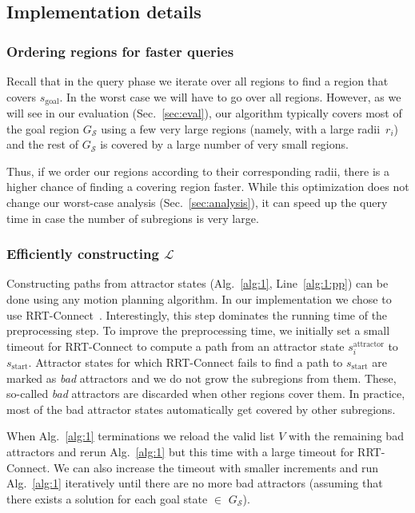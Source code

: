\documentclass[letterpaper]{article} %
\newcommand{\calL}{\ensuremath{\mathcal{L}}\xspace}
\newcommand{\calS}{\ensuremath{\mathcal{S}}\xspace}
\newcommand{\sAttract}{\ensuremath{s^{\text{attractor}}_i}\xspace}
\newcommand{\sStart}{\ensuremath{s_{\text{start}}\xspace}}
\newcommand{\sGoal}{\ensuremath{s_{\text{goal}}\xspace}}
\begin{document}
\subsection{Implementation details}
\label{subsec:impl}

\subsubsection{Ordering regions for faster queries}
Recall that in the query phase we iterate over all regions to find a region that covers \sGoal. 
In the worst case we will have to go over all regions.
However, as we will see in our evaluation (Sec.~\ref{sec:eval}), our algorithm typically covers most of the goal region $G_\calS$ using a few very large regions (namely, with a large radii~$r_i$) and the rest of $G_\calS$ is covered by a large number of very small regions.

Thus, if we order our regions according to their corresponding radii, there is a higher chance of finding a covering region faster. While this optimization does not change our worst-case analysis (Sec.~\ref{sec:analysis}), it can speed up the query time in case the number of subregions is very large.

\subsubsection{Efficiently constructing $\calL$}
Constructing paths from attractor states (Alg.~\ref{alg:1}, Line~\ref{alg:1:pp}) can be done using any motion planning algorithm.
In our implementation we chose to use \textsf{RRT-Connect}~\cite{KL00}.
Interestingly, this step dominates the running time of the preprocessing step.
%
To improve the preprocessing time, we initially set a small timeout for \textsf{RRT-Connect} to compute a path from an attractor state $\sAttract$ to $\sStart$.
Attractor states for which \textsf{RRT-Connect} fails to find a path to $\sStart$ are marked as \textit{bad} attractors and we do not grow the subregions from them. 
These, so-called \textit{bad} attractors are discarded when other regions cover them.
In practice, most of the bad attractor states automatically get covered by other subregions. 

When Alg.~\ref{alg:1} terminations we reload the valid list $V$ with the remaining bad attractors and rerun Alg.~\ref{alg:1} but this time with a large timeout for \textsf{RRT-Connect}. 
%
We can also increase the timeout with smaller increments and run Alg.~\ref{alg:1} iteratively until there are no more bad attractors (assuming that there exists a solution for each goal state $\in$ $G_\calS$).
\end{document}
